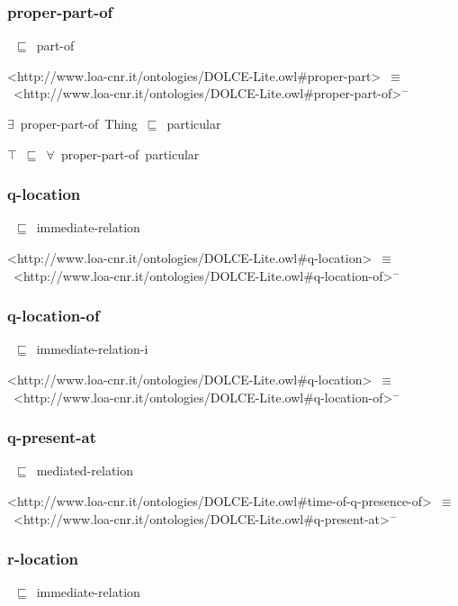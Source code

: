 \documentclass{article}
\begin{document}
\subsubsection*{proper-part-of}

~\ensuremath{\sqsubseteq}~part-of

<http://www.loa-cnr.it/ontologies/DOLCE-Lite.owl#proper-part>~\ensuremath{\equiv}~<http://www.loa-cnr.it/ontologies/DOLCE-Lite.owl#proper-part-of>\ensuremath{^-}



\ensuremath{\exists}~proper-part-of~Thing~\ensuremath{\sqsubseteq}~particular

\ensuremath{\top}~\ensuremath{\sqsubseteq}~\ensuremath{\forall}~proper-part-of~particular

\subsubsection*{q-location}

~\ensuremath{\sqsubseteq}~immediate-relation

<http://www.loa-cnr.it/ontologies/DOLCE-Lite.owl#q-location>~\ensuremath{\equiv}~<http://www.loa-cnr.it/ontologies/DOLCE-Lite.owl#q-location-of>\ensuremath{^-}

\subsubsection*{q-location-of}

~\ensuremath{\sqsubseteq}~immediate-relation-i

<http://www.loa-cnr.it/ontologies/DOLCE-Lite.owl#q-location>~\ensuremath{\equiv}~<http://www.loa-cnr.it/ontologies/DOLCE-Lite.owl#q-location-of>\ensuremath{^-}

\subsubsection*{q-present-at}

~\ensuremath{\sqsubseteq}~mediated-relation

<http://www.loa-cnr.it/ontologies/DOLCE-Lite.owl#time-of-q-presence-of>~\ensuremath{\equiv}~<http://www.loa-cnr.it/ontologies/DOLCE-Lite.owl#q-present-at>\ensuremath{^-}

\subsubsection*{r-location}

~\ensuremath{\sqsubseteq}~immediate-relation
\end{document}
